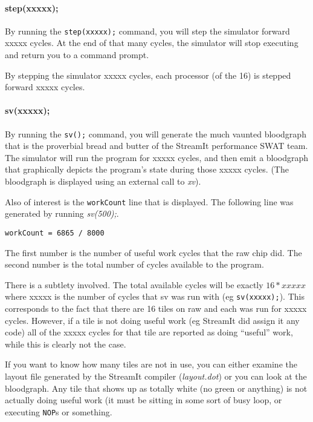 \paragraph{step(xxxxx);}
By running the \texttt{step(xxxxx);} command, you will step the simulator 
forward xxxxx cycles. At the end of that many cycles, the simulator 
will stop executing and return you to a command prompt.

By stepping the simulator xxxxx cycles, each processor (of the 16) is stepped
forward xxxxx cycles.

\paragraph{sv(xxxxx);}
By running the \texttt{sv();} command, you will generate the much vaunted
bloodgraph that is the proverbial bread and butter of the StreamIt performance
SWAT team. The simulator will run the program for xxxxx cycles, and then
emit a bloodgraph that graphically depicts the program's state during those
xxxxx cycles. (The bloodgraph is displayed using an external call to \textit{xv}).

Also of interest is the \texttt{workCount} line that is displayed. The
following line was generated by running \textit{sv(500);}.

\begin{verbatim}workCount = 6865 / 8000\end{verbatim}

The first number is the number of useful work cycles that the raw chip did. The second
number is the total number of cycles available to the program.

There is a subtlety involved. The total available cycles will be exactly $16*xxxxx$ where 
xxxxx is the number of cycles that sv was run with (eg \texttt{sv(xxxxx);}). This
corresponds to the fact that there are 16 tiles on raw and each was run for xxxxx cycles.
However, if a tile is not doing useful work (eg StreamIt did assign it any code)
all of the xxxxx cycles for that tile are reported as doing ``useful'' work, while this is
clearly not the case. 

If you want to know how many tiles are not in use, you can either examine the 
layout file generated by the StreamIt compiler (\textit{layout.dot}) or you
can look at the bloodgraph. Any tile that shows up as totally white (no green or anything) is
not actually doing useful work (it must be sitting in some sort of busy loop,
or executing \texttt{NOP}s or something.

